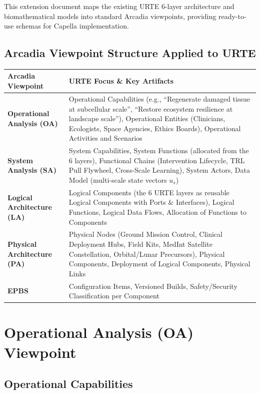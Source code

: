 \documentclass[11pt,a4paper]{report}
\begin{document}
This extension document maps the existing URTE 6-layer architecture and biomathematical models into standard Arcadia viewpoints, providing ready-to-use schemas for Capella implementation.

\section{Arcadia Viewpoint Structure Applied to URTE}

\begin{tabular}{>{\raggedright\arraybackslash}p{3.5cm} p{10cm}}
\toprule
\textbf{Arcadia Viewpoint} & \textbf{URTE Focus \& Key Artifacts} \\
\midrule
\textbf{Operational Analysis (OA)} & Operational Capabilities (e.g., ``Regenerate damaged tissue at subcellular scale'', ``Restore ecosystem resilience at landscape scale''), Operational Entities (Clinicians, Ecologists, Space Agencies, Ethics Boards), Operational Activities and Scenarios \\
\textbf{System Analysis (SA)} & System Capabilities, System Functions (allocated from the 6 layers), Functional Chains (Intervention Lifecycle, TRL Pull Flywheel, Cross-Scale Learning), System Actors, Data Model (multi-scale state vectors $u_s$) \\
\textbf{Logical Architecture (LA)} & Logical Components (the 6 URTE layers as reusable Logical Components with Ports \& Interfaces), Logical Functions, Logical Data Flows, Allocation of Functions to Components \\
\textbf{Physical Architecture (PA)} & Physical Nodes (Ground Mission Control, Clinical Deployment Hubs, Field Kits, MedInt Satellite Constellation, Orbital/Lunar Precursors), Physical Components, Deployment of Logical Components, Physical Links \\
\textbf{EPBS} & Configuration Items, Versioned Builds, Safety/Security Classification per Component \\
\bottomrule
\end{tabular}

\chapter{Operational Analysis (OA) Viewpoint}

\section{Operational Capabilities}
\end{document}
